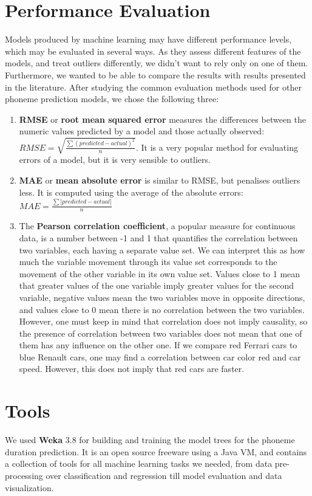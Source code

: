 \documentclass[a4paper]{scrreprt}
\begin{document}
\section{Performance Evaluation}
Models produced by machine learning may have different performance levels, which may be evaluated in several ways. As they assess different features of the models, and treat outliers differently, we didn't want to rely only on one of them. Furthermore, we wanted to be able to compare the results with results presented in the literature. After studying the common evaluation methods used for other phoneme prediction models, we chose the following three: 
\begin{enumerate}
	\item \textbf{RMSE} or \textbf{root mean squared error} measures the differences between the numeric values predicted by a model and those actually observed: 
$RMSE = \sqrt{\frac{\sum(predicted-actual)^2}{n}}$. It is a very popular method for evaluating errors of a model, but it is very sensible to outliers.
	\item \textbf{MAE} or \textbf{mean absolute error} is similar to RMSE, but penalises outliers less. It is computed using the average of the absolute errors: $MAE = \frac{\sum\left|predicted-actual\right|}{n}$
	\item The \textbf{Pearson correlation coefficient}, a popular measure for continuous data, is a number between -1 and 1 that quantifies the correlation between two variables, each having a separate value set. We can interpret this as how much the variable movement through its value set corresponds to the movement of the other variable in its own value set. Values close to 1 mean that greater values of the one variable imply greater values for the second variable, negative values mean the two variables move in opposite directions, and values close to 0 mean there is no correlation between the two variables. However, one must keep in mind that correlation does not imply causality, so the presence of correlation between two variables does not mean that one of them has any influence on the other one. If we compare red Ferrari cars to blue Renault cars, one may find a correlation between car color red and car speed. However, this does not imply that red cars are faster.
\end{enumerate}

\section{Tools}
We used \textbf{Weka} 3.8 for building and training the model trees for the phoneme duration prediction. It is an open source freeware using a Java VM, and contains a collection of tools for all machine learning tasks we needed, from data pre-processing over classification and regression till model evaluation and data visualization.
\end{document}
